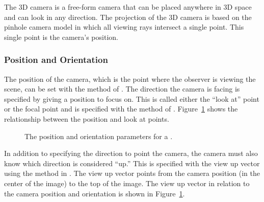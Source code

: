 
The 3D camera is a free-form camera that can be placed anywhere in 3D space
and can look in any direction. The projection of the 3D camera is based on
the  pinhole camera model in
which all viewing rays intersect a single point. This single point is the
camera's position.

\subsubsection{Position and Orientation}


The position of the camera, which is the point where the observer is
viewing the scene, can be set with the  method of
. The direction the camera is facing is specified by
giving a position to focus on. This is called either the ``look at'' point
or the focal point and is specified with the  method of
. Figure~\ref{fig:CameraPositionOrientation3D} shows
the relationship between the position and look at points.

\begin{figure}[htb]
  \centering
  \caption{The position and orientation parameters for a
    .}
  \label{fig:CameraPositionOrientation3D}
\end{figure}


In addition to specifying the direction to point the camera, the camera
must also know which direction is considered ``up.'' This is specified with
the view up vector using the  method in
. The view up vector points from the camera position
(in the center of the image) to the top of the image. The view up vector in
relation to the camera position and orientation is shown in
Figure~\ref{fig:CameraPositionOrientation3D}.


